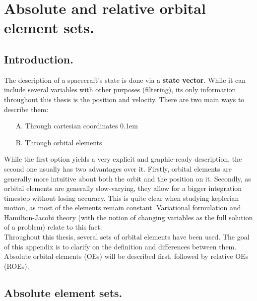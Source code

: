 \chapter{Absolute and relative orbital element sets.}
%
\label{chap: App_OEs}
%
\section{Introduction.}
%
\indent The description of a spacecraft's state is done via a \textbf{state vector}. While it can include several variables with other purposes (\eg filtering), its only information throughout this thesis is the position and velocity. There are two main ways to describe them:
%
\begin{itemize}
\item[A.] Through cartesian coordinates
\itemsep0.1em 
\item[B.] Through orbital elements
\end{itemize}
%
\indent While the first option yields a very explicit and graphic-ready description, the second one usually has two advantages over it. Firstly, orbital elements are generally more intuitive about both the orbit and the position on it. Secondly, as orbital elements are generally slow-varying, they allow for a bigger integration timestep without losing accuracy. This is quite clear when studying keplerian motion, as most of the elements remain constant. Variational formulation and Hamilton-Jacobi theory (with the notion of changing variables as the full solution of a problem) relate to this fact. \\
%
\indent Throughout this thesis, several sets of orbital elements have been used. The goal of this appendix is to clarify on the definition and differences between them. Absolute orbital elements (OEs) will be described first, followed by relative OEs (ROEs).
%
\section{Absolute element sets.}
%
